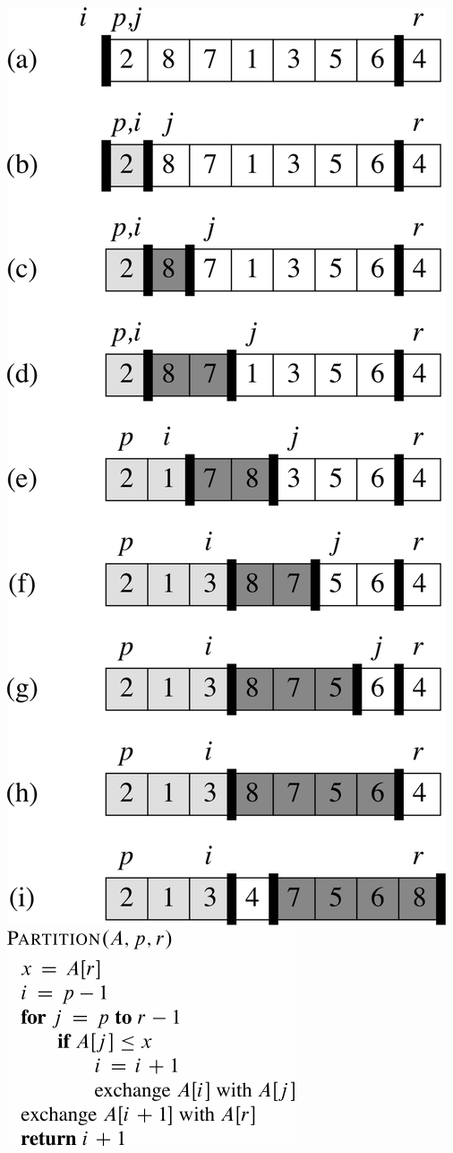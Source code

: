 \documentclass{beamer}
\newcommand{\sect}[1]{
\section{#1}
\begin{frame}[fragile]\frametitle{#1}
}
\begin{document}
\sect{}
\begin{multicols}{2}
\includegraphics[height=0.9\textheight]{Fig-7-1.pdf}
\columnbreak
\hfill\includegraphics{Partition}
\end{multicols}
\end{frame}
\end{document}
